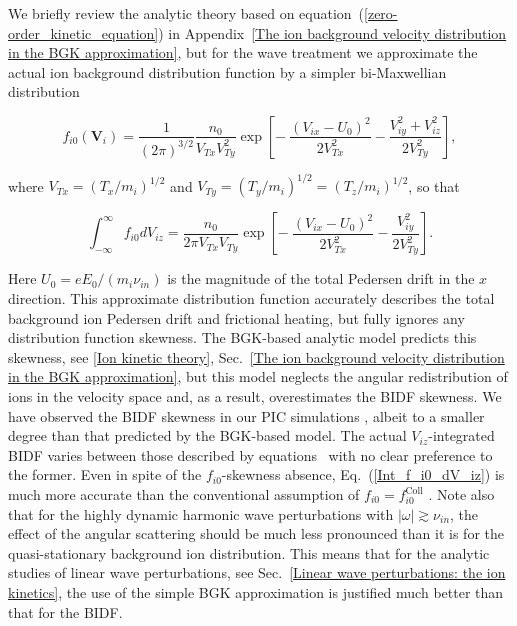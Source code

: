 \documentclass[draft]{agujournal2019}
\renewcommand{\vec}{\mathbf}
\begin{document}
We briefly review the analytic theory based on
equation~(\ref{zero-order_kinetic_equation}) in
Appendix~\ref{The ion background velocity distribution in the BGK approximation}, 
but for the wave treatment we approximate the actual ion background
distribution function by a simpler bi-Maxwellian distribution
\begin{linenomath*}
\begin{equation}
f_{i0}(\vec{V}_{i})=\frac{1}{\left(  2\pi\right)  ^{3/2}}\frac{n_{0}}{V_{Tx}V_{Ty}^{2}}\exp\left[  -~\frac{(V_{ix}-U_{0})^{2}%
}{2V_{Tx}^{2}}-\frac{V_{iy}^{2}+V_{iz}^{2}}{2V_{Ty}^{2}}\right],
\label{f_i0_Gaussian}
\end{equation}
\end{linenomath*}
where $V_{Tx}=(T_{x}/m_{i})^{1/2}$ and $V_{Ty}=(T_{y}/m_{i})^{1/2}=(T_{z}/m_{i})^{1/2}$, so that
\begin{linenomath*}
\begin{equation}
\int_{-\infty}^{\infty}f_{i0}dV_{iz}=\frac{n_{0}}{2\pi V_{Tx}V_{Ty}}\exp\left[ 
 -~\frac{(V_{ix}-U_{0})^{2}}{2V_{Tx}^{2}}-\frac{V_{iy}^{2}}{2V_{Ty}^{2}}\right]  .
\label{Int_f_i0_dV_iz}
\end{equation}
\end{linenomath*}
Here $U_{0}=eE_{0}/(m_{i}\nu_{in})$ is the magnitude of the total Pedersen
drift in the $x$ direction. This approximate distribution function accurately
describes the total background ion Pedersen drift and frictional heating, but
fully ignores any distribution function skewness. The BGK-based analytic model 
predicts this skewness, see \ref{Ion kinetic theory},
Sec.~\ref{The ion background velocity distribution in the BGK approximation}, 
but this model neglects the angular redistribution of ions in the velocity 
space and, as a result, overestimates the BIDF skewness.
We have observed the BIDF skewness in our PIC simulations 
\cite{Koontaweepunya:Non-Maxwellian24}, albeit to a smaller degree than that predicted by the BGK-based model. 
The actual $V_{iz}$-integrated BIDF varies
between those described by equations~
with no clear preference to the former. Even in spite
of the $f_{i0}$-skewness absence, Eq.~(\ref{Int_f_i0_dV_iz}) is much more
accurate than the conventional assumption of $f_{i0}=f_{i0}^{\mathrm{Coll}}$
. 
Note also that for the
highly dynamic harmonic wave perturbations with $\left\vert \omega\right\vert
\gtrsim\nu_{in}$, the effect of the angular scattering should be much less
pronounced than it is for the quasi-stationary background ion distribution.
This means that for the analytic studies of linear wave perturbations, see
Sec.~\ref{Linear wave perturbations: the ion kinetics}, the use of the simple
BGK approximation is justified much better than that for the BIDF.
\end{document}
